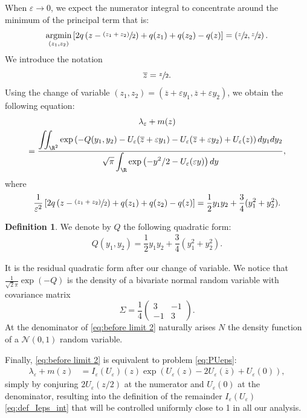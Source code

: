 \documentclass[10pt]{amsart}
\let\mathcal\mathscr
\newcommand{\psfrac}[2]{\sfrac{(#1)}{#2}}
\newcommand{\cN}{\mathcal{N}}
\theoremstyle{plain}
\theoremstyle{definition}
\newtheorem{definition}[thm]{Definition}
\let\eps\varepsilon
\let\ds\displaystyle
\newcommand{\bz}{\overline{z}}
\DeclareMathOperator*{\argmin}{argmin}
\begin{document}
When $\eps\to 0$, we expect the numerator integral to concentrate around the minimum of the principal term that is:
\[ \argmin_{(z_1,z_2)} \left[ 2q \left(z-\psfrac{z_1+z_2}{2} \right) + q(z_1) + q(z_2) - q(z) \right] = \left(\sfrac{z}{2}, \sfrac{z}{2}\right).\]
We introduce the notation
\[ \overline{z} = \sfrac{z}{2}.\]
Using the change of variable $(z_1,z_2) = (\bz + \eps y_1, \bz + \eps y_2) $, we obtain the following equation:
\begin{multline}\label{eq:before limit 2}
\lambda_\eps + m(z)\\
= \dfrac{\displaystyle \iint_{\R^2} \exp\left(-Q(y_1,y_2) - U_\eps(\bz+\eps y_1) - U_\eps(\bz+\eps y_2) + U_\eps(z) \right) d y_1 d y_2}{\ds
\sqrt{\pi} \int_\R \exp\left(- {y^2}/{2} - U_\eps(\eps y) \right) d y},
\end{multline}
where
\begin{equation*}
\dfrac{1}{\eps^2} \left[ 2q \left(z-\psfrac{z_1+z_2}{2} \right) + q(z_1) + q(z_2) - q(z) \right] = \dfrac{1}{2}y_1y_2 + \dfrac{3}{4}(y_1^2+y_2^2).
\end{equation*}
\begin{definition}
We denote by $Q$ the following quadratic form:
\begin{align*}
Q(y_1,y_2) = \dfrac{1}{2}y_1y_2 + \dfrac{3}{4}(y_1^2+y_2^2).
\end{align*}
\end{definition}
It is the residual quadratic form after our change of variable. We notice that $\frac{1}{\sqrt{2}\pi}\exp(-Q)$ is the density of a bivariate normal random variable with covariance matrix
\begin{equation}\label{eq:covariance}
\Sigma =\frac14 \begin{pmatrix}
3 & -1 \\ -1& 3
\end{pmatrix}.
\end{equation}
At the denominator of \eqref{eq:before limit 2} naturally arises $N$ the density function of a $\cN(0,1)$ random variable.

Finally, \eqref{eq:before limit 2} is equivalent to problem \eqref{eq:PUeps}:
\begin{align*}
\lambda_\eps + m(z) & = I_\eps(U_\eps)(z) \exp \left(U_\eps(z)-2U_\eps\left(\bz\right) + U_\eps(0) \right),
\end{align*}
simply by conjuring $2 U_\eps(z/2)$ at the numerator and $U_\eps(0)$ at the denominator, resulting into the definition of the remainder $I_\eps(U_\eps)$ \eqref{eq:def_Ieps_int} that will be controlled uniformly close to 1 in all our analysis.
\end{document}
